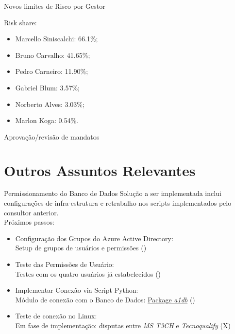 \documentclass[t,aspectratio=169]{beamer}
\begin{document}
\begin{frame}{Novos limites de Risco por Gestor}
	
	{\color{blue1}Risk share:} 
	
	
	\begin{itemize}
		\item Marcello Siniscalchi: 66.1\%;
		\item Bruno Carvalho: 41.65\%;
		\item Pedro Carneiro: 11.90\%;
		\item Gabriel Blum: 3.57\%;
		\item Norberto Alves: 3.03\%;
		\item Marlon Koga: 0.54\%.		
	\end{itemize}

	
	{\color{blue1}Aprovação/revisão de mandatos}

\end{frame}




\section[Outros]{Outros Assuntos Relevantes}
\begin{frame}{Permissionamento do Banco de Dados}
	Solução a ser implementada inclui configurações de infra-estrutura e retrabalho nos scripts implementados pelo consultor anterior.\\
	Próximos passos:
	\begin{itemize}
		\item {\color{blue1} Configuração dos Grupos do Azure Active Directory:}\\
		Setup de grupos de usuários e permissões ({\color{green}\checkmark})\\
		\item {\color{blue1} Teste das Permissões de Usuário:}\\
		Testes com os quatro usuários já estabelecidos ({\color{green}\checkmark})\\
		\item {\color{blue1} Implementar Conexão via Script Python:}\\
		Módulo de conexão com o Banco de Dados: \href{https://github.com/asset1capital/a1db}{Package \emph{a1db}}  ({\color{green}\checkmark})
		\item {\color{blue1} Teste de conexão no Linux:}\\
		Em fase de implementação: disputas entre \emph{MS T3CH} e \emph{Tecnoqualify}  ({\color{red}X})
	\end{itemize}
\end{frame}

\end{document}
